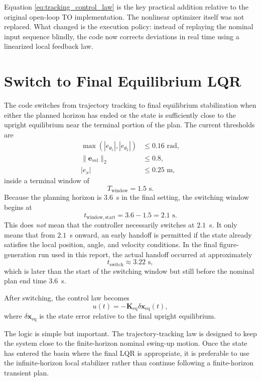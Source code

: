 \documentclass[conference]{IEEEtran}
\begin{document}
Equation \eqref{eq:tracking_control_law} is the key practical addition relative to the original open-loop TO implementation. The nonlinear optimizer itself was not replaced. What changed is the execution policy: instead of replaying the nominal input sequence blindly, the code now corrects deviations in real time using a linearized local feedback law.

\section{Switch to Final Equilibrium LQR}
The code switches from trajectory tracking to final equilibrium stabilization when either the planned horizon has ended or the state is sufficiently close to the upright equilibrium near the terminal portion of the plan. The current thresholds are
\begin{align}
\max(|e_{\theta_1}|,|e_{\theta_2}|) &\le 0.16 \text{ rad}, \\
\|\bm{e}_{\mathrm{vel}}\|_2 &\le 0.8, \\
|e_x| &\le 0.25 \text{ m},
\end{align}
inside a terminal window of
\begin{equation}
T_{\mathrm{window}} = 1.5 \text{ s}.
\end{equation}
Because the planning horizon is $3.6$~s in the final setting, the switching window begins at
\begin{equation}
t_{\mathrm{window,start}} = 3.6 - 1.5 = 2.1 \text{ s}.
\end{equation}
This does \emph{not} mean that the controller necessarily switches at $2.1$~s. It only means that from $2.1$~s onward, an early handoff is permitted if the state already satisfies the local position, angle, and velocity conditions. In the final figure-generation run used in this report, the actual handoff occurred at approximately
\begin{equation}
t_{\mathrm{switch}} \approx 3.22 \text{ s},
\end{equation}
which is later than the start of the switching window but still before the nominal plan end time $3.6$~s.

After switching, the control law becomes
\begin{equation}
u(t)= -\bm{K}_{\mathrm{eq}}\delta\bm{x}_{\mathrm{eq}}(t),
\end{equation}
where $\delta\bm{x}_{\mathrm{eq}}$ is the state error relative to the final upright equilibrium.

The logic is simple but important. The trajectory-tracking law is designed to keep the system close to the finite-horizon nominal swing-up motion. Once the state has entered the basin where the final LQR is appropriate, it is preferable to use the infinite-horizon local stabilizer rather than continue following a finite-horizon transient plan.
\end{document}
